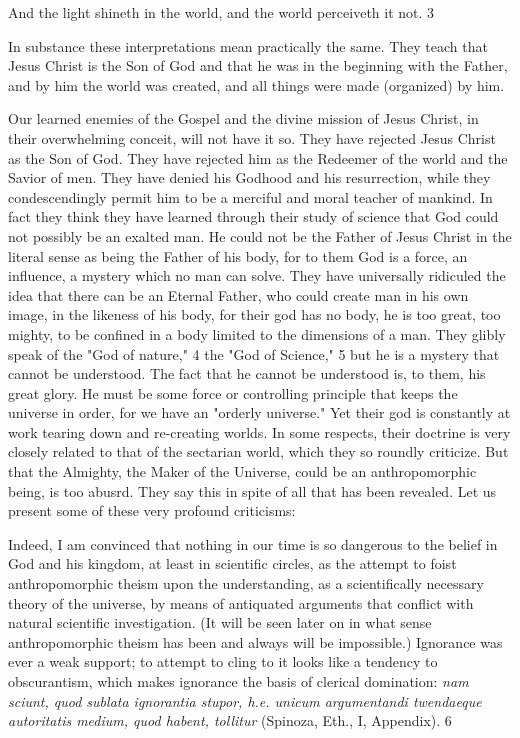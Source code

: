 And the light shineth in the world, and the world perceiveth it not. 3

In substance these interpretations mean practically the same. They teach that Jesus Christ is
the Son of God and that he was in the beginning with the Father, and by him the world was
created, and all things were made (organized) by him.

Our learned enemies of the Gospel and the divine mission of Jesus Christ, in their
overwhelming conceit, will not have it so. They have rejected Jesus Christ as the Son of God.
They have rejected him as the Redeemer of the world and the Savior of men. They have
denied his Godhood and his resurrection, while they condescendingly permit him to be a
merciful and moral teacher of mankind. In fact they think they have learned through their
study of science that God could not possibly be an exalted man. He could not be the Father of
Jesus Christ in the literal sense as being the Father of his body, for to them God is a force, an
influence, a mystery which no man can solve. They have universally ridiculed the idea that
there can be an Eternal Father, who could create man in his own image, in the likeness of his
body, for their god has no body, he is too great, too mighty, to be confined in a body limited
to the dimensions of a man. They glibly speak of the "God of nature," 4 the "God of
Science," 5 but he is a mystery that cannot be understood. The fact that he cannot be
understood is, to them, his great glory. He must be some force or controlling principle that
keeps the universe in order, for we have an "orderly universe." Yet their god is constantly at
work tearing down and re-creating worlds. In some respects, their doctrine is very closely
related to that of the sectarian world, which they so roundly criticize. But that the Almighty,
the Maker of the Universe, could be an anthropomorphic being, is too abusrd. They say this
in spite of all that has been revealed. Let us present some of these very profound criticisms:

Indeed, I am convinced that nothing in our time is so dangerous to the belief in God and his
kingdom, at least in scientific circles, as the attempt to foist anthropomorphic theism upon
the understanding, as a scientifically necessary theory of the universe, by means of
antiquated arguments that conflict with natural scientific investigation. (It will be seen later
on in what sense anthropomorphic theism has been and always will be impossible.)
Ignorance was ever a weak support; to attempt to cling to it looks like a tendency to
obscurantism, which makes ignorance the basis of clerical domination: \textit{nam sciunt, quod
sublata ignorantia stupor, h.e. unicum argumentandi twendaeque autoritatis medium, quod
habent, tollitur} (Spinoza, Eth., I, Appendix). 6

